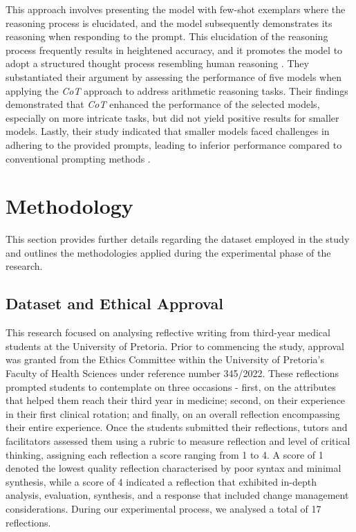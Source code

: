 \documentclass{article}
\begin{document}
This approach involves presenting the model with few-shot exemplars where the reasoning process is elucidated, and the model subsequently demonstrates its reasoning when responding to the prompt. This elucidation of the reasoning process frequently results in heightened accuracy, and it promotes the model to adopt a structured thought process resembling human reasoning \cite{wei2022chain}. They substantiated their argument by assessing the performance of five models when applying the \textit{CoT} approach to address arithmetic reasoning tasks. Their findings demonstrated that \textit{CoT} enhanced the performance of the selected models, especially on more intricate tasks, but did not yield positive results for smaller models. Lastly, their study indicated that smaller models faced challenges in adhering to the provided prompts, leading to inferior performance compared to conventional prompting methods \cite{wei2022chain}.

\section{Methodology}
This section provides further details regarding the dataset employed in the study and outlines the methodologies applied during the experimental phase of the research.

\subsection {Dataset and Ethical Approval}
This research focused on analysing reflective writing from third-year medical students at the University of Pretoria. Prior to commencing the study, approval was granted from the Ethics Committee within the University of Pretoria's Faculty of Health Sciences under reference number 345/2022. These reflections prompted students to contemplate on three occasions - first, on the attributes that helped them reach their third year in medicine; second, on their experience in their first clinical rotation; and finally, on an overall reflection encompassing their entire experience. Once the students submitted their reflections, tutors and facilitators assessed them using a rubric to measure reflection and level of critical thinking, assigning each reflection a score ranging from 1 to 4. A score of 1 denoted the lowest quality reflection characterised by poor syntax and minimal synthesis, while a score of 4 indicated a reflection that exhibited in-depth analysis, evaluation, synthesis, and a response that included change management considerations.  During our experimental process, we analysed a total of 17 reflections. 
\end{document}
